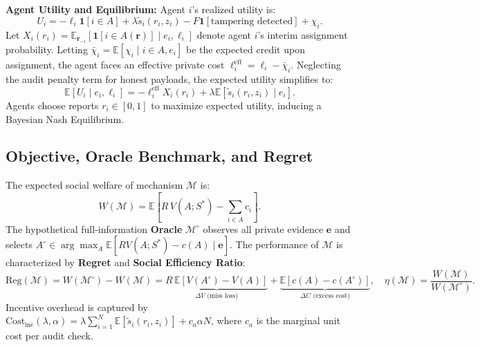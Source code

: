 \documentclass{article}
\theoremstyle{definition}
\begin{document}
\noindent \textbf{Agent Utility and Equilibrium:}
Agent $i$'s realized utility is:
\begin{equation}
    U_i = -\ell_i \mathbf{1}[i \in A] + \lambda \tilde{s}_i(r_i, z_i) - F \mathbf{1}[\text{tampering detected}] + \chi_i.
\end{equation}
Let $X_i(r_i) = \mathbb{E}_{\mathbf{r}_{-i}}[\mathbf{1}[i \in A(\mathbf{r})] \mid e_i, \ell_i]$ denote agent $i$'s interim assignment probability. Letting $\bar{\chi}_i = \mathbb{E}[\chi_i \mid i \in A, e_i]$ be the expected credit upon assignment, the agent faces an effective private cost $\ell_i^{\mathrm{eff}} = \ell_i - \bar{\chi}_i$. Neglecting the audit penalty term for honest payloads, the expected utility simplifies to:
\begin{equation}
    \mathbb{E}[U_i \mid e_i, \ell_i] = -\ell_i^{\mathrm{eff}} X_i(r_i) + \lambda \mathbb{E}[\tilde{s}_i(r_i, z_i) \mid e_i].
\end{equation}
Agents choose reports $r_i \in [0, 1]$ to maximize expected utility, inducing a Bayesian Nash Equilibrium.

\subsection{Objective, Oracle Benchmark, and Regret}
The expected social welfare of mechanism $\mathcal{M}$ is:
\begin{equation}
    W(\mathcal{M}) = \mathbb{E}\left[ R\, V(A; S^*) - \sum_{i \in A} c_i \right].
\end{equation}
The hypothetical full-information \textbf{Oracle} $\mathcal{M}^\circ$ observes all private evidence $\mathbf{e}$ and selects $A^\circ \in \arg\max_{A} \mathbb{E}[R V(A; S^*) - c(A) \mid \mathbf{e}]$. The performance of $\mathcal{M}$ is characterized by \textbf{Regret} and \textbf{Social Efficiency Ratio}:
\begin{equation}
    \mathrm{Reg}(\mathcal{M}) = W(\mathcal{M}^\circ) - W(\mathcal{M}) = \underbrace{R\, \mathbb{E}[V(A^\circ) - V(A)]}_{\Delta V \text{ (miss loss)}} + \underbrace{\mathbb{E}[c(A) - c(A^\circ)]}_{\Delta C \text{ (excess cost)}}, \quad \eta(\mathcal{M}) = \frac{W(\mathcal{M})}{W(\mathcal{M}^\circ)}.
\end{equation}
Incentive overhead is captured by $\mathrm{Cost}_{\mathrm{inc}}(\lambda, \alpha) = \lambda \sum_{i=1}^N \mathbb{E}[\tilde{s}_i(r_i, z_i)] + c_a \alpha N$, where $c_a$ is the marginal unit cost per audit check.
\end{document}
